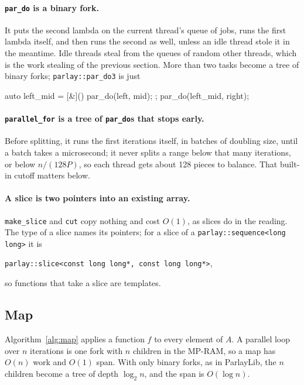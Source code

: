 \paragraph{\texttt{par\_do} is a binary fork.} It puts the second lambda on the current thread's queue of jobs, runs the first lambda itself, and then runs the second as well, unless an idle thread stole it in the meantime. Idle threads steal from the queues of random other threads, which is the work stealing of the previous section. More than two tasks become a tree of binary forks; \texttt{parlay::par\_do3} is just
\begin{code}
auto left_mid = [&]() { par_do(left, mid); };
par_do(left_mid, right);
\end{code}

\paragraph{\texttt{parallel\_for} is a tree of \texttt{par\_do}s that stops early.} Before splitting, it runs the first iterations itself, in batches of doubling size, until a batch takes a microsecond; it never splits a range below that many iterations, or below $n / (128P)$, so each thread gets about 128 pieces to balance. That built-in cutoff matters below.

\paragraph{A slice is two pointers into an existing array.} \texttt{make\_slice} and \texttt{cut} copy nothing and cost $O(1)$, as slices do in the reading. The type of a slice names its pointers; for a slice of a \texttt{parlay::sequence<long long>} it is
\begin{center}
  \texttt{parlay::slice<const long long*, const long long*>},
\end{center}
so functions that take a slice are templates.

\subsection{Map}

Algorithm~\ref{alg:map} applies a function $f$ to every element of $A$. A parallel loop over $n$ iterations is one fork with $n$ children in the MP-RAM, so a map has $O(n)$ work and $O(1)$ span. With only binary forks, as in ParlayLib, the $n$ children become a tree of depth $\log_2 n$, and the span is $O(\log n)$.

